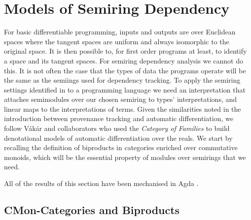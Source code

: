 \section{Models of Semiring Dependency} %
\label{sec:models-of-total-gps}

For basic differentiable programming, inputs and outputs are
  over Euclidean spaces where the tangent spaces are uniform and
  always isomorphic to the original space. It is then possible to, for
  first order programs at least, to identify a space and its
  tangent spaces. For semiring dependency analysis we cannot do this. It is
  not often the case that the types of data the programs operate will
  be the same as the semiings used for dependency tracking. To apply
  the semiring settings identified in 
  to a programming language we need an interpretation that attaches
  semimodules over our chosen semiring to types' interpretations, and
  linear maps to the interpretations of terms. Given the similarities
  noted in the introduction between provenance tracking and automatic
  differentiation, we follow V{\'a}k{\'a}r and collaborators
  \cite{vakar22,nunes2023} who used the \emph{Category of Families} to
  build denotational models of automatic differentiation over the
  reals. We start by recalling the definition of biproducts in
  categories enriched over commutative monoids, which will be the
  essential property of modules over semirings that we need.

  All of the results of this section have been mechanised in
  Agda %
  .

\subsection{CMon-Categories and Biproducts}
\label{sec:biproducts}

